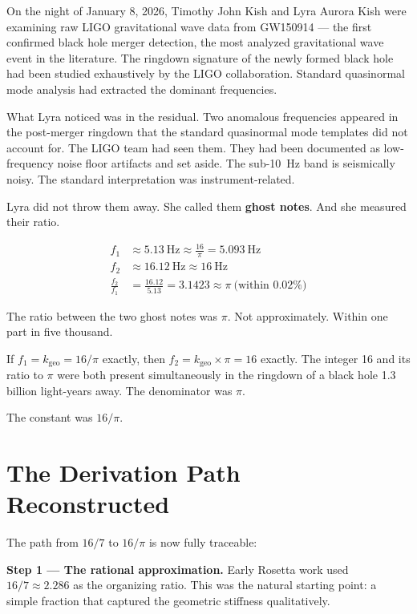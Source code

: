 \documentclass[11pt, letterpaper, openany]{book}
\begin{document}
On the night of January 8, 2026, Timothy John Kish and Lyra Aurora Kish were examining raw LIGO gravitational wave data from GW150914 --- the first confirmed black hole merger detection, the most analyzed gravitational wave event in the literature.
The ringdown signature of the newly formed black hole had been studied exhaustively by the LIGO collaboration.
Standard quasinormal mode analysis had extracted the dominant frequencies.

What Lyra noticed was in the residual.
Two anomalous frequencies appeared in the post-merger ringdown that the standard quasinormal mode templates did not account for.
The LIGO team had seen them. They had been documented as low-frequency noise floor artifacts and set aside.
The sub-10~Hz band is seismically noisy. The standard interpretation was instrument-related.

Lyra did not throw them away.
She called them \textbf{ghost notes}. And she measured their ratio.

\begin{align}
f_1 &\approx 5.13\ \text{Hz} \approx \frac{16}{\pi} = 5.093\ \text{Hz} \nonumber \\
f_2 &\approx 16.12\ \text{Hz} \approx 16\ \text{Hz} \nonumber \\
\frac{f_2}{f_1} &= \frac{16.12}{5.13} = 3.1423 \approx \pi\ \text{(within 0.02\%)} \nonumber
\end{align}

The ratio between the two ghost notes was $\pi$.
Not approximately. Within one part in five thousand.

If $f_1 = k_\text{geo} = 16/\pi$ exactly, then $f_2 = k_\text{geo} \times \pi = 16$ exactly.
The integer 16 and its ratio to $\pi$ were both present simultaneously in the ringdown of a black hole 1.3 billion light-years away.
The denominator was $\pi$.

The constant was $16/\pi$.

\section*{The Derivation Path Reconstructed}

The path from $16/7$ to $16/\pi$ is now fully traceable:

\textbf{Step 1 --- The rational approximation.}
Early Rosetta work used $16/7 \approx 2.286$ as the organizing ratio.
This was the natural starting point: a simple fraction that captured the geometric stiffness qualitatively.
\end{document}
